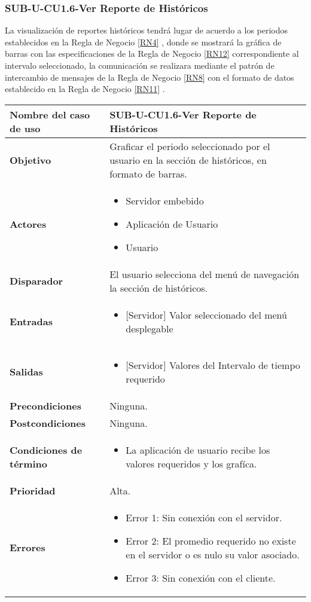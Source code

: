 \subsubsection{SUB-U-CU1.6-Ver Reporte de Históricos}\label{SUB-U-CU1.6}
La visualización de reportes históricos tendrá lugar de acuerdo a los periodos establecidos en la Regla de Negocio \ref{RN4} , donde se mostrará la gráfica de barras con las especificaciones de la Regla de Negocio \ref{RN12} correspondiente al  intervalo seleccionado, la comunicación se realizara mediante el patrón de intercambio de mensajes de la Regla de Negocio \ref{RN8} con el formato de datos establecido en la Regla de Negocio \ref{RN11} .

\begin{longtable}{|J{5cm}|J{10.3cm}|}
	\hline
	\textbf{Nombre del caso de uso} &
		SUB-U-CU1.6-Ver Reporte de Históricos \\ \hline
	\textbf{Objetivo} &
		Graficar el periodo seleccionado por el usuario en la sección de históricos, en formato de barras. \\ \hline
	\textbf{Actores} &
		\begin{itemize}
			\item Servidor embebido
			\item Aplicación de Usuario
			\item Usuario 
		\end{itemize} \\ \hline
	\textbf{Disparador} & 
		El usuario selecciona del menú de navegación la sección de históricos. \\ \hline 
	\textbf{Entradas} & 
		\begin{itemize}
			\item{[Servidor]} Valor seleccionado del menú desplegable
		\end{itemize}\\ \hline 
	\textbf{Salidas} & 
		\begin{itemize}
			\item{[Servidor]} Valores del Intervalo de tiempo requerido
		\end{itemize} \\ \hline
	\textbf{Precondiciones} &
		Ninguna.\\ \hline
	\textbf{Postcondiciones} &
		Ninguna.\\ \hline
	\textbf{Condiciones de término} & 
		\begin{itemize}
			\item La aplicación de usuario recibe los valores requeridos y los grafíca.
		\end{itemize} \\ \hline 
	\textbf{Prioridad} & 
		Alta. \\ \hline
	\textbf{Errores} & 
		\begin{itemize}
		    \item \label{CU5:Error1} Error 1: Sin conexión con el servidor.
			\item \label{CU5:Error2} Error 2: El promedio requerido no existe en el servidor o es nulo su valor asociado.
		    \item \label{CU5:Error3} Error 3: Sin conexión con el cliente.
			

\end{itemize}
\end{longtable}
